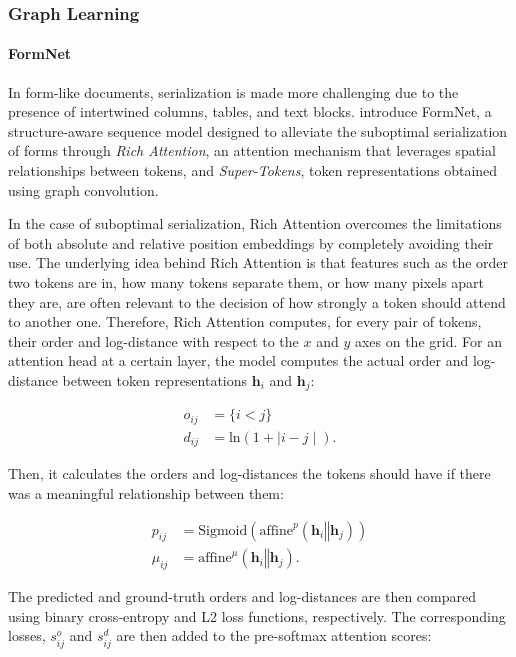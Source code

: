 
\subsubsection{Graph Learning}

\paragraph{FormNet} 

In form-like documents, serialization is made more challenging due to the presence of intertwined columns, tables, and text blocks. \citet{lee2022formnet} introduce FormNet, a structure-aware sequence model designed to alleviate the suboptimal serialization of forms through \textit{Rich Attention}, an attention mechanism that leverages spatial relationships between tokens, and \textit{Super-Tokens}, token representations obtained using graph convolution. 

In the case of suboptimal serialization, Rich Attention overcomes the limitations of both absolute and relative position embeddings by completely avoiding their use. The underlying idea behind Rich Attention is that features such as the order two tokens are in, how many tokens separate them, or how many pixels apart they are, are often relevant to the decision of how strongly a token should attend to another one. Therefore, Rich Attention computes, for every pair of tokens, their order and log-distance with respect to the $x$ and $y$ axes on the grid. For an attention head at a certain layer, the model computes the actual order and log-distance between token representations $\bm{h}_i$ and $\bm{h}_j$:

\begin{align}
    o_{ij} &= \{i < j\} \\
    d_{ij} &= \text{ln}(1 + \mid i - j \mid).
\end{align}

\noindent Then, it calculates the  orders and log-distances the tokens should have if there was a meaningful relationship between them:

\begin{align}
    p_{ij} &= \text{Sigmoid}\left(\text{affine}^p(\bm{h}_i \mathbin\Vert \bm{h}_j)\right)\\
    \mu_{ij} &= \text{affine}^{\mu}(\bm{h}_i \mathbin\Vert \bm{h}_j).
\end{align}

\noindent The predicted and ground-truth orders and log-distances are then compared using binary cross-entropy and L2 loss functions, respectively. The corresponding losses, $s^{o}_{ij}$ and $s^{d}_{ij}$ are then added to the pre-softmax attention scores:

